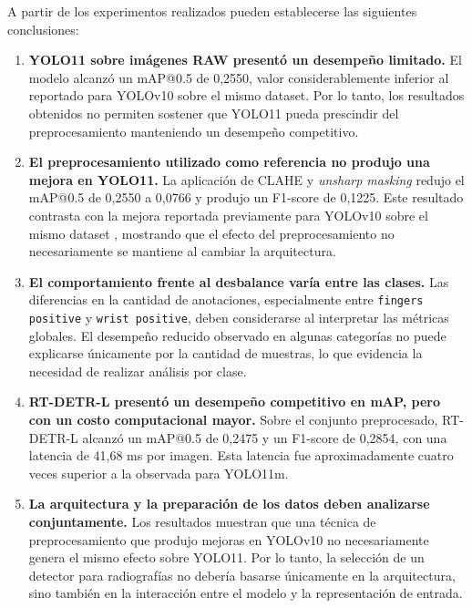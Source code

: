 \documentclass[conference]{IEEEtran}
\begin{document}
A partir de los experimentos realizados pueden establecerse las siguientes conclusiones:

\begin{enumerate}

    \item \textbf{YOLO11 sobre imágenes RAW presentó un desempeño limitado.}
    El modelo alcanzó un mAP@0.5 de 0,2550, valor considerablemente inferior al reportado para YOLOv10 sobre el mismo dataset. Por lo tanto, los resultados obtenidos no permiten sostener que YOLO11 pueda prescindir del preprocesamiento manteniendo un desempeño competitivo.

    \item \textbf{El preprocesamiento utilizado como referencia no produjo una mejora en YOLO11.}
    La aplicación de CLAHE y \textit{unsharp masking} redujo el mAP@0.5 de 0,2550 a 0,0766 y produjo un F1-score de 0,1225. Este resultado contrasta con la mejora reportada previamente para YOLOv10 sobre el mismo dataset \cite{b3_srinivasu}, mostrando que el efecto del preprocesamiento no necesariamente se mantiene al cambiar la arquitectura.

    \item \textbf{El comportamiento frente al desbalance varía entre las clases.}
    Las diferencias en la cantidad de anotaciones, especialmente entre \texttt{fingers positive} y \texttt{wrist positive}, deben considerarse al interpretar las métricas globales. El desempeño reducido observado en algunas categorías no puede explicarse únicamente por la cantidad de muestras, lo que evidencia la necesidad de realizar análisis por clase.

    \item \textbf{RT-DETR-L presentó un desempeño competitivo en mAP, pero con un costo computacional mayor.}
    Sobre el conjunto preprocesado, RT-DETR-L alcanzó un mAP@0.5 de 0,2475 y un F1-score de 0,2854, con una latencia de 41,68 ms por imagen. Esta latencia fue aproximadamente cuatro veces superior a la observada para YOLO11m.

    \item \textbf{La arquitectura y la preparación de los datos deben analizarse conjuntamente.}
    Los resultados muestran que una técnica de preprocesamiento que produjo mejoras en YOLOv10 no necesariamente genera el mismo efecto sobre YOLO11. Por lo tanto, la selección de un detector para radiografías no debería basarse únicamente en la arquitectura, sino también en la interacción entre el modelo y la representación de entrada.

\end{enumerate}
\end{document}
